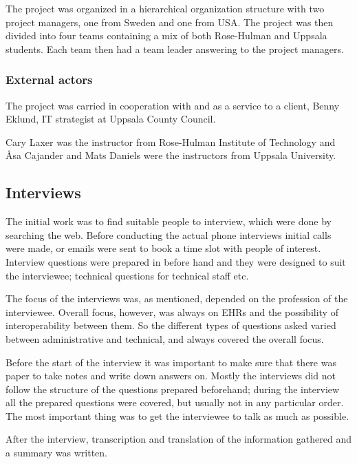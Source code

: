 \documentclass[14pt]{article}
\begin{document}
The project was organized in a hierarchical organization structure with two project managers, one from Sweden and one from USA. The project was then divided into four teams containing a mix of both Rose-Hulman and Uppsala students. Each team then had a team leader answering to the project managers.

\subsubsection{External actors}
The project was carried in cooperation with and as a service to a client, Benny Eklund, IT strategist at Uppsala County Council.

Cary Laxer was the instructor from Rose-Hulman Institute of Technology and Åsa Cajander and Mats Daniels were the instructors from Uppsala University.

\subsection{Interviews}

The initial work was to find suitable people to interview, which were done by searching the web. Before conducting the actual phone interviews initial calls were made, or emails were sent to book a time slot with people of interest. Interview questions were prepared in before hand and they were designed to suit the interviewee; technical questions for technical staff etc. 

The focus of the interviews was, as mentioned, depended on the profession of the interviewee. Overall focus, however, was always on \glspl{EHR} and the possibility of interoperability between them. So the different types of questions asked varied between administrative and technical, and always covered the overall focus. 

Before the start of the interview it was important to make sure that there was paper to take notes and write down answers on. Mostly the interviews did not follow the structure of the questions prepared beforehand; during the interview all the prepared questions were covered, but usually not in any particular order. The most important thing was to get the interviewee to talk as much as possible.

After the interview, transcription and translation of the information gathered and a summary was written.
\end{document}
